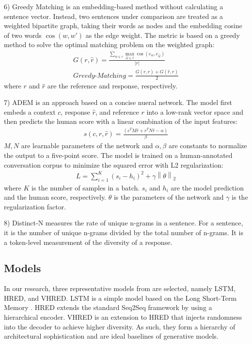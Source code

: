 \documentclass[conference]{IEEEtran}
\begin{document}
6) Greedy Matching \cite{GreedyAndOptimal} is an embedding-based method without calculating a sentence vector.
Instead, two sentences under comparison are treated as a weighted bipartite graph, taking their words as nodes and the embedding cosine of two words $\cos(w, w')$ as the edge weight.
The metric is based on a greedy method to solve the optimal matching problem on the weighted graph:
\begin{align}
    G(r, \hat{r}) = \frac{
    \sum_{w \in r} \max_{\hat{w} \in \hat{r}} \cos(e_w, e_{\hat{w}})
    }{ |r| } \\
    \textit{Greedy-Matching} = \frac{
    G(r, \hat{r}) + G(\hat{r}, r)
    }{2}
\end{align}
where $r$ and $\hat{r}$ are the reference and response, respectively.

7) ADEM \cite{ADEM} is an approach based on a concise nueral network.
The model first embeds a context $c$, response $\hat{r}$, and reference $r$ into a low-rank vector space and then predicts the human score with a linear combination of the input features:
\begin{align}
    s(c, r, \hat{r}) = \frac{(c^T M \hat{r} + r^T N \hat{r} - \alpha)}{\beta}
\end{align}
$M, N$ are learnable parameters of the network and $\alpha, \beta$ are constants to normalize the output to a five-point score.
The model is trained on a human-annotated conversation corpus to minimize the squared error with L2 regularization:
\begin{align}
    L = \sum_{i=1}^{K} (s_i - h_i)^2 + \gamma \left\| \theta \right\| _2
\end{align}
where $K$ is the number of samples in a batch.
$s_i$ and $h_i$ are the model prediction and the human score, respectively.
$\theta$ is the parameters of the network and $\gamma$ is the regularization factor.

8) Distinct-N \cite{MMI} measures the rate of unique n-grams in a sentence.
For a sentence, it is the number of unique n-grams divided by the total number of n-grams.
It is a token-level measurement of the diversity of a response.

\subsection{Models}
In our research, three representative models from \cite{VHRED} are selected, namely LSTM, HRED, and VHRED. LSTM is a simple model based on the Long Short-Term Memory \cite{LSTM}.
HRED extends the standard Seq2Seq framework by using a hierarchical encoder.
VHRED is an extension to HRED that injects randomness into the decoder to achieve higher diversity.
As such, they form a hierarchy of architectural sophistication and are ideal baselines of generative models.
\end{document}
